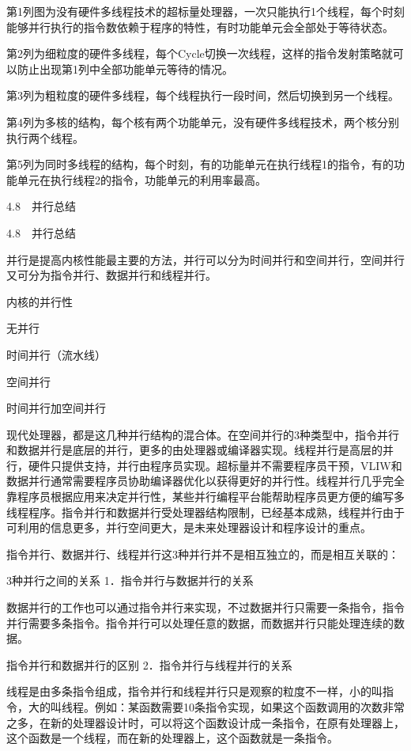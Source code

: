 \documentclass[12pt,UTF8]{ctexbook}
\begin{document}
第1列图为没有硬件多线程技术的超标量处理器，一次只能执行1个线程，每个时刻能够并行执行的指令数依赖于程序的特性，有时功能单元会全部处于等待状态。

第2列为细粒度的硬件多线程，每个Cycle切换一次线程，这样的指令发射策略就可以防止出现第1列中全部功能单元等待的情况。

第3列为粗粒度的硬件多线程，每个线程执行一段时间，然后切换到另一个线程。

第4列为多核的结构，每个核有两个功能单元，没有硬件多线程技术，两个核分别执行两个线程。

第5列为同时多线程的结构，每个时刻，有的功能单元在执行线程1的指令，有的功能单元在执行线程2的指令，功能单元的利用率最高。


4.8　并行总结


4.8　并行总结

并行是提高内核性能最主要的方法，并行可以分为时间并行和空间并行，空间并行又可分为指令并行、数据并行和线程并行。

内核的并行性

无并行

时间并行（流水线）

空间并行

时间并行加空间并行

现代处理器，都是这几种并行结构的混合体。在空间并行的3种类型中，指令并行和数据并行是底层的并行，更多的由处理器或编译器实现。线程并行是高层的并行，硬件只提供支持，并行由程序员实现。超标量并不需要程序员干预，VLIW和数据并行通常需要程序员协助编译器优化以获得更好的并行性。线程并行几乎完全靠程序员根据应用来决定并行性，某些并行编程平台能帮助程序员更方便的编写多线程程序。指令并行和数据并行受处理器结构限制，已经基本成熟，线程并行由于可利用的信息更多，并行空间更大，是未来处理器设计和程序设计的重点。

指令并行、数据并行、线程并行这3种并行并不是相互独立的，而是相互关联的：

3种并行之间的关系
1．指令并行与数据并行的关系

数据并行的工作也可以通过指令并行来实现，不过数据并行只需要一条指令，指令并行需要多条指令。指令并行可以处理任意的数据，而数据并行只能处理连续的数据。

指令并行和数据并行的区别
2．指令并行与线程并行的关系

线程是由多条指令组成，指令并行和线程并行只是观察的粒度不一样，小的叫指令，大的叫线程。例如：某函数需要10条指令实现，如果这个函数调用的次数非常之多，在新的处理器设计时，可以将这个函数设计成一条指令，在原有处理器上，这个函数是一个线程，而在新的处理器上，这个函数就是一条指令。
\end{document}

